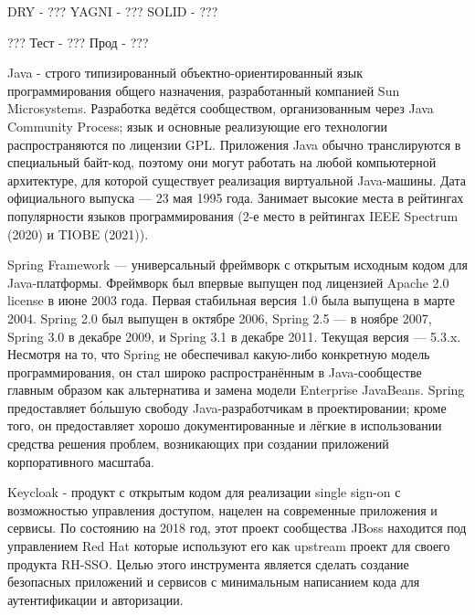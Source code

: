 
        DRY - ???
        YAGNI - ???
        SOLID - ???
    
        ???
        Тест - ???
        Прод - ???
    \anonsubsection{}
    \anonsubsection{}
    \anonsubsection{}
    \anonsubsection{}
    \anonsubsection{}
    \anonsubsection{}

        Java - строго типизированный объектно-ориентированный язык программирования общего назначения, разработанный компанией Sun Microsystems. Разработка ведётся сообществом, организованным через Java Community Process; язык и основные реализующие его технологии распространяются по лицензии GPL. Приложения Java обычно транслируются в специальный байт-код, поэтому они могут работать на любой компьютерной архитектуре, для которой существует реализация виртуальной Java-машины. Дата официального выпуска — 23 мая 1995 года. Занимает высокие места в рейтингах популярности языков программирования (2-е место в рейтингах IEEE Spectrum (2020) и TIOBE (2021)).

        Spring Framework — универсальный фреймворк с открытым исходным кодом для Java-платформы. Фреймворк был впервые выпущен под лицензией Apache 2.0 license в июне 2003 года. Первая стабильная версия 1.0 была выпущена в марте 2004. Spring 2.0 был выпущен в октябре 2006, Spring 2.5 — в ноябре 2007, Spring 3.0 в декабре 2009, и Spring 3.1 в декабре 2011. Текущая версия — 5.3.x. Несмотря на то, что Spring не обеспечивал какую-либо конкретную модель программирования, он стал широко распространённым в Java-сообществе главным образом как альтернатива и замена модели Enterprise JavaBeans. Spring предоставляет бо́льшую свободу Java-разработчикам в проектировании; кроме того, он предоставляет хорошо документированные и лёгкие в использовании средства решения проблем, возникающих при создании приложений корпоративного масштаба.

        Keycloak - продукт с открытым кодом для реализации single sign-on с возможностью управления доступом, нацелен на современные приложения и сервисы. По состоянию на 2018 год, этот проект сообщества JBoss находится под управлением Red Hat которые используют его как upstream проект для своего продукта RH-SSO. Целью этого инструмента является сделать создание безопасных приложений и сервисов с минимальным написанием кода для аутентификации и авторизации. 

